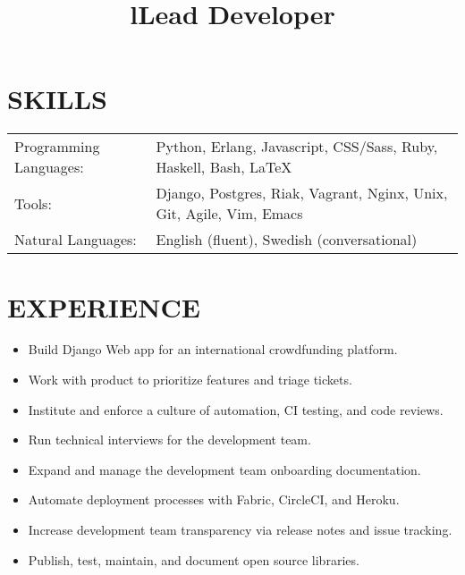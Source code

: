 \documentclass[line]{res}
\title{l}\dates{r}\\
\begin{document}
\begin{resume}

\section{SKILLS}
\begin{tabular}{ l l }
Programming Languages: &
Python,
Erlang,
Javascript,
CSS/Sass,
Ruby,
Haskell,
Bash,
\LaTeX \\

Tools: &
Django,
Postgres,
Riak,
Vagrant,
Nginx,
Unix,
Git,
Agile,
Vim,
Emacs \\

Natural Languages: &
English (fluent),
Swedish (conversational)
\end{tabular}

\section {EXPERIENCE}
\vspace {2 pt}

\title{Lead Developer}
\begin{position}
\noindent
\vspace {-10 pt}
\begin{itemize}

\item Build Django Web app for an international crowdfunding platform.
\item Work with product to prioritize features and triage tickets.
\item Institute and enforce a culture of automation, CI testing, and code reviews.
\item Run technical interviews for the development team.
\item Expand and manage the development team onboarding documentation.
\item Automate deployment processes with Fabric, CircleCI, and Heroku.
\item Increase development team transparency via release notes and issue tracking.
\item Publish, test, maintain, and document open source libraries.

\end{itemize}
\end{position}



\end{resume}
\end{document}
